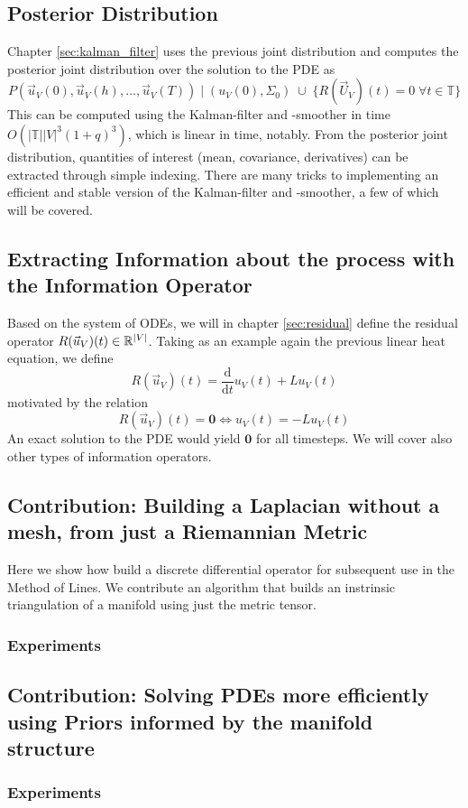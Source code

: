 \subsection*{Posterior Distribution}
Chapter \ref{sec:kalman_filter} uses the previous joint distribution and computes the posterior joint distribution over the solution to the PDE as $$P(\vec{u}_V(0), \vec{u}_V(h), \dots, \vec{u}_V(T)) \;\Big| \; (u_V(0), \Sigma_0) \; \cup \; \{R(\vec{U}_V)(t) = 0 \; \forall t \in \mathbb{T}\}$$ This can be computed using the Kalman-filter and -smoother in time $O(|\mathbb{T}||V|^3(1+q)^3)$, which is linear in time, notably. From the posterior joint distribution, quantities of interest (mean, covariance, derivatives) can be extracted through simple indexing.
There are many tricks to implementing an efficient and stable version of the Kalman-filter and -smoother, a few of which will be covered.

\subsection*{Extracting Information about the process with the Information Operator}
Based on the system of ODEs, we will in chapter \ref{sec:residual} define the residual operator $R(\vec{u}_V)(t) \in \mathbb{R}^{|V|}$. Taking as an example again the previous linear heat equation, we define $$R(\vec{u}_V)(t) = \frac{\text{d}}{\text{d} t}u_V(t) + L u_V(t)$$ motivated by the relation $$R(\vec{u}_V)(t) = \mathbf{0} \iff u_V(t) = -Lu_V(t)$$ An exact solution to the PDE would yield $\mathbf{0}$ for all timesteps. We will cover also other types of information operators.

\subsection*{Contribution: Building a Laplacian without a mesh, from just a Riemannian Metric}
Here we show how build a discrete differential operator for subsequent use in the Method of Lines. We contribute an algorithm that builds an instrinsic triangulation of a manifold using just the metric tensor.
\subsubsection*{Experiments}

\subsection*{Contribution: Solving PDEs more efficiently using Priors informed by the manifold structure}

\subsubsection*{Experiments}


\ifdefined\COMPILINGFROMMAIN
\else    
    
\fi